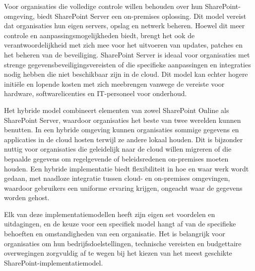 \subtitle{SharePoint Server (on-premises)}
Voor organisaties die volledige controle willen behouden over hun SharePoint-omgeving, biedt SharePoint Server een on-premises oplossing. Dit model vereist dat organisaties hun eigen servers, opslag en netwerk beheren. Hoewel dit meer controle en aanpassingsmogelijkheden biedt, brengt het ook de verantwoordelijkheid met zich mee voor het uitvoeren van updates, patches en het beheren van de beveiliging. SharePoint Server is ideaal voor organisaties met strenge gegevensbeveiligingsvereisten of die specifieke aanpassingen en integraties nodig hebben die niet beschikbaar zijn in de cloud. Dit model kan echter hogere initiële en lopende kosten met zich meebrengen vanwege de vereiste voor hardware, softwarelicenties en IT-personeel voor onderhoud.

\subtitle{SharePoint Hybrid}
Het hybride model combineert elementen van zowel SharePoint Online als SharePoint Server, waardoor organisaties het beste van twee werelden kunnen benutten. In een hybride omgeving kunnen organisaties sommige gegevens en applicaties in de cloud hosten terwijl ze andere lokaal houden. Dit is bijzonder nuttig voor organisaties die geleidelijk naar de cloud willen migreren of die bepaalde gegevens om regelgevende of beleidsredenen on-premises moeten houden. Een hybride implementatie biedt flexibiliteit in hoe en waar werk wordt gedaan, met naadloze integratie tussen cloud- en on-premises omgevingen, waardoor gebruikers een uniforme ervaring krijgen, ongeacht waar de gegevens worden gehost.

Elk van deze implementatiemodellen heeft zijn eigen set voordelen en uitdagingen, en de keuze voor een specifiek model hangt af van de specifieke behoeften en omstandigheden van een organisatie. Het is belangrijk voor organisaties om hun bedrijfsdoelstellingen, technische vereisten en budgettaire overwegingen zorgvuldig af te wegen bij het kiezen van het meest geschikte SharePoint-implementatiemodel.













\lipsum[7-20]
